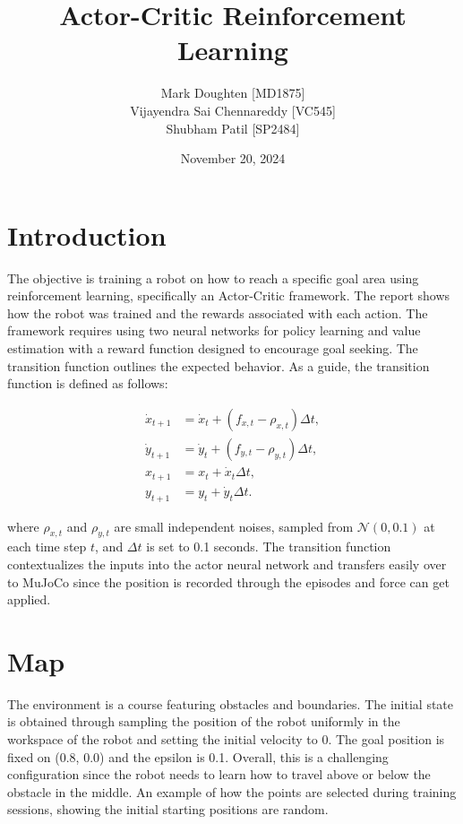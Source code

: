 \documentclass[12pt]{article}
\title{Actor-Critic Reinforcement Learning}
\author{
    Mark Doughten [MD1875] \\
    Vijayendra Sai Chennareddy [VC545] \\
    Shubham Patil [SP2484]
}
\date{November 20, 2024}
\begin{document}
\maketitle

\section{Introduction}
 The objective is training a robot on how to reach a specific goal area using reinforcement learning, specifically an Actor-Critic framework. The report shows how the robot was trained and the rewards associated with each action. The framework requires using two neural networks for policy learning and value estimation with a reward function designed to encourage goal seeking. The transition function outlines the expected behavior. As a guide, the transition function is defined as follows:

\begin{align*}
\dot{x}_{t+1} &= \dot{x}_t + (f_{x,t} - \rho_{x,t}) \Delta t, \\
\dot{y}_{t+1} &= \dot{y}_t + (f_{y,t} - \rho_{y,t}) \Delta t, \\
x_{t+1} &= x_t + \dot{x}_t \Delta t, \\
y_{t+1} &= y_t + \dot{y}_t \Delta t.
\end{align*}

where \( \rho_{x,t} \) and \( \rho_{y,t} \) are small independent noises, sampled from \( \mathcal{N}(0, 0.1) \) at each time step \( t \), and \( \Delta t \) is set to 0.1 seconds. The transition function contextualizes the inputs into the actor neural network and transfers easily over to MuJoCo since the position is recorded through the episodes and force can get applied.

\section{Map}

The environment is a course featuring obstacles and boundaries. The initial state is obtained through sampling the position of the robot uniformly in the workspace of the robot and setting the initial velocity to 0.  The goal position is fixed on (0.8, 0.0) and the epsilon is 0.1. Overall, this is a challenging configuration since the robot needs to learn how to travel above or below the obstacle in the middle. An example of how the points are selected during training sessions, showing the initial starting positions are random.
\end{document}
